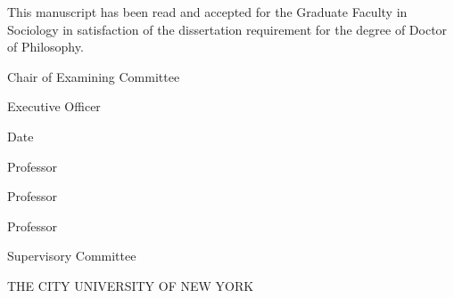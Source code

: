 \clearpage\thispagestyle{empty}
\begin{vplace}
\begin{SingleSpace}

\centering

\noindent This manuscript has been read and accepted for the Graduate Faculty
in Sociology in satisfaction of the dissertation requirement for the degree of
Doctor of Philosophy.

\vskip 1in
\flushleft

\hrulefill
\newline
\AdviserName
\newline
Chair of Examining Committee
\vspace{0.5in}

\hrulefill
\newline
\EOName
\newline
Executive Officer
\vspace{0.5in}

\hrulefill
\newline
Date
\vspace{0.5in}
\newline

Professor \FirstCommitteeMember \\
\hrulefill

Professor \SecondCommitteeMember \\
\hrulefill

Professor \ThirdCommitteeMember \\
\hrulefill

Supervisory Committee

\vskip 1in
\centering

\MakeUppercase{The City University of New York}

\end{SingleSpace}
\end{vplace}
